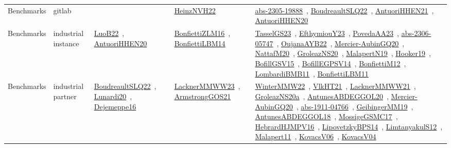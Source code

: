 {\begin{longtable}{lp{3cm}>{\raggedright\arraybackslash}p{6cm}>{\raggedright\arraybackslash}p{6cm}>{\raggedright\arraybackslash}p{8cm}}
Benchmarks & gitlab &  & \href{works/HeinzNVH22.pdf}{HeinzNVH22}~\cite{HeinzNVH22} & \href{works/abs-2305-19888.pdf}{abs-2305-19888}~\cite{abs-2305-19888}, \href{works/BoudreaultSLQ22.pdf}{BoudreaultSLQ22}~\cite{BoudreaultSLQ22}, \href{works/AntuoriHHEN21.pdf}{AntuoriHHEN21}~\cite{AntuoriHHEN21}, \href{works/AntuoriHHEN20.pdf}{AntuoriHHEN20}~\cite{AntuoriHHEN20}\\
Benchmarks & industrial instance & \href{works/LuoB22.pdf}{LuoB22}~\cite{LuoB22}, \href{works/AntuoriHHEN20.pdf}{AntuoriHHEN20}~\cite{AntuoriHHEN20} & \href{works/BonfiettiZLM16.pdf}{BonfiettiZLM16}~\cite{BonfiettiZLM16}, \href{works/BonfiettiLBM14.pdf}{BonfiettiLBM14}~\cite{BonfiettiLBM14} & \href{works/TasselGS23.pdf}{TasselGS23}~\cite{TasselGS23}, \href{works/EfthymiouY23.pdf}{EfthymiouY23}~\cite{EfthymiouY23}, \href{works/PovedaAA23.pdf}{PovedaAA23}~\cite{PovedaAA23}, \href{works/abs-2306-05747.pdf}{abs-2306-05747}~\cite{abs-2306-05747}, \href{works/OujanaAYB22.pdf}{OujanaAYB22}~\cite{OujanaAYB22}, \href{works/Mercier-AubinGQ20.pdf}{Mercier-AubinGQ20}~\cite{Mercier-AubinGQ20}, \href{works/NattafM20.pdf}{NattafM20}~\cite{NattafM20}, \href{works/GroleazNS20.pdf}{GroleazNS20}~\cite{GroleazNS20}, \href{works/MalapertN19.pdf}{MalapertN19}~\cite{MalapertN19}, \href{works/Hooker19.pdf}{Hooker19}~\cite{Hooker19}, \href{works/BofillGSV15.pdf}{BofillGSV15}~\cite{BofillGSV15}, \href{works/BofillEGPSV14.pdf}{BofillEGPSV14}~\cite{BofillEGPSV14}, \href{works/BonfiettiM12.pdf}{BonfiettiM12}~\cite{BonfiettiM12}, \href{works/LombardiBMB11.pdf}{LombardiBMB11}~\cite{LombardiBMB11}, \href{works/BonfiettiLBM11.pdf}{BonfiettiLBM11}~\cite{BonfiettiLBM11}\\
Benchmarks & industrial partner & \href{works/BoudreaultSLQ22.pdf}{BoudreaultSLQ22}~\cite{BoudreaultSLQ22}, \href{works/Lunardi20.pdf}{Lunardi20}~\cite{Lunardi20}, \href{works/Dejemeppe16.pdf}{Dejemeppe16}~\cite{Dejemeppe16} & \href{works/LacknerMMWW23.pdf}{LacknerMMWW23}~\cite{LacknerMMWW23}, \href{works/ArmstrongGOS21.pdf}{ArmstrongGOS21}~\cite{ArmstrongGOS21} & \href{works/WinterMMW22.pdf}{WinterMMW22}~\cite{WinterMMW22}, \href{works/VlkHT21.pdf}{VlkHT21}~\cite{VlkHT21}, \href{works/LacknerMMWW21.pdf}{LacknerMMWW21}~\cite{LacknerMMWW21}, \href{works/GroleazNS20a.pdf}{GroleazNS20a}~\cite{GroleazNS20a}, \href{works/AntunesABDEGGOL20.pdf}{AntunesABDEGGOL20}~\cite{AntunesABDEGGOL20}, \href{works/Mercier-AubinGQ20.pdf}{Mercier-AubinGQ20}~\cite{Mercier-AubinGQ20}, \href{works/abs-1911-04766.pdf}{abs-1911-04766}~\cite{abs-1911-04766}, \href{works/GeibingerMM19.pdf}{GeibingerMM19}~\cite{GeibingerMM19}, \href{works/AntunesABDEGGOL18.pdf}{AntunesABDEGGOL18}~\cite{AntunesABDEGGOL18}, \href{works/MossigeGSMC17.pdf}{MossigeGSMC17}~\cite{MossigeGSMC17}, \href{works/HebrardHJMPV16.pdf}{HebrardHJMPV16}~\cite{HebrardHJMPV16}, \href{works/LipovetzkyBPS14.pdf}{LipovetzkyBPS14}~\cite{LipovetzkyBPS14}, \href{works/LimtanyakulS12.pdf}{LimtanyakulS12}~\cite{LimtanyakulS12}, \href{works/Malapert11.pdf}{Malapert11}~\cite{Malapert11}, \href{works/KovacsV06.pdf}{KovacsV06}~\cite{KovacsV06}, \href{works/KovacsV04.pdf}{KovacsV04}~\cite{KovacsV04}\\

\end{longtable}}
